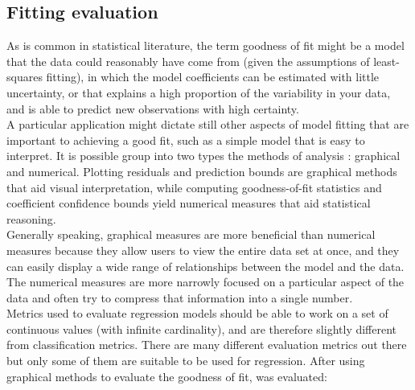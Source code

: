 \subsection{Fitting evaluation}
\label{sec:fiteval}
As is common in statistical literature, the term goodness of fit might be a model that the data could reasonably have come from (given the assumptions of least-squares fitting), in which the model coefficients can be estimated with little uncertainty, or that explains a high proportion of the variability in your data, and is able to predict new observations with high certainty. \\

\noindent A particular application might dictate still other aspects of model fitting that are important to achieving a good fit, such as a simple model that is easy to interpret. It is possible group into two types the methods of analysis \cite[]{Evaluati10:online}: graphical and numerical. Plotting residuals and prediction bounds are graphical methods that aid visual interpretation, while computing goodness-of-fit statistics and coefficient confidence bounds yield numerical measures that aid statistical reasoning.\\

\noindent Generally speaking, graphical measures are more beneficial than numerical measures because they allow users to view the entire data set at once, and they can easily display a wide range of relationships between the model and the data. The numerical measures are more narrowly focused on a particular aspect of the data and often try to compress that information into a single number. \\

\noindent Metrics used to evaluate regression models should be able to work on a set of continuous values (with infinite cardinality), and are therefore slightly different from classification metrics. There are many different evaluation metrics out there but only some of them are suitable to be used for regression. After using graphical methods to evaluate the goodness of fit, was evaluated:

